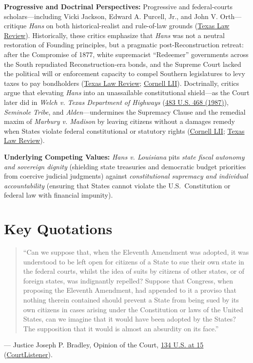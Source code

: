 \documentclass[12pt]{article}
\begin{document}
\textbf{Progressive and Doctrinal Perspectives:} Progressive and federal-courts scholars---including Vicki Jackson, Edward A. Purcell, Jr., and John V. Orth---critique \textit{Hans} on both historical-realist and rule-of-law grounds (\href{https://texaslawreview.org/state-sovereign-immunity-after-the-revolution/}{Texas Law Review}). Historically, these critics emphasize that \textit{Hans} was not a neutral restoration of Founding principles, but a pragmatic post-Reconstruction retreat: after the Compromise of 1877, white supremacist ``Redeemer'' governments across the South repudiated Reconstruction-era bonds, and the Supreme Court lacked the political will or enforcement capacity to compel Southern legislatures to levy taxes to pay bondholders (\href{https://texaslawreview.org/state-sovereign-immunity-after-the-revolution/}{Texas Law Review}; \href{https://www.law.cornell.edu/constitution-conan/amendment-11/postbellum-jurisprudence-on-the-eleventh-amendment}{Cornell LII}). Doctrinally, critics argue that elevating \textit{Hans} into an unassailable constitutional shield---as the Court later did in \textit{Welch v. Texas Department of Highways} (\href{https://supreme.justia.com/cases/federal/us/483/468/}{483 U.S. 468 (1987)}), \textit{Seminole Tribe}, and \textit{Alden}---undermines the Supremacy Clause and the remedial maxim of \textit{Marbury v. Madison} by leaving citizens without a damages remedy when States violate federal constitutional or statutory rights (\href{https://www.law.cornell.edu/supct/html/94-12.ZD.html}{Cornell LII}; \href{https://texaslawreview.org/state-sovereign-immunity-after-the-revolution/}{Texas Law Review}).

\textbf{Underlying Competing Values:} \textit{Hans v. Louisiana} pits \textit{state fiscal autonomy and sovereign dignity} (shielding state treasuries and democratic budget priorities from coercive judicial judgments) against \textit{constitutional supremacy and individual accountability} (ensuring that States cannot violate the U.S.\ Constitution or federal law with financial impunity).

\section{Key Quotations}
\begin{quote}
``Can we suppose that, when the Eleventh Amendment was adopted, it was understood to be left open for citizens of a State to sue their own state in the federal courts, whilst the idea of suits by citizens of other states, or of foreign states, was indignantly repelled? Suppose that Congress, when proposing the Eleventh Amendment, had appended to it a proviso that nothing therein contained should prevent a State from being sued by its own citizens in cases arising under the Constitution or laws of the United States, can we imagine that it would have been adopted by the States? The supposition that it would is almost an absurdity on its face.''
\end{quote}
\noindent --- Justice Joseph P. Bradley, Opinion of the Court, \href{https://supreme.justia.com/cases/federal/us/134/1/}{134 U.S. at 15} (\href{https://www.courtlistener.com/opinion/92702/hans-v-louisiana/}{CourtListener}).
\end{document}
